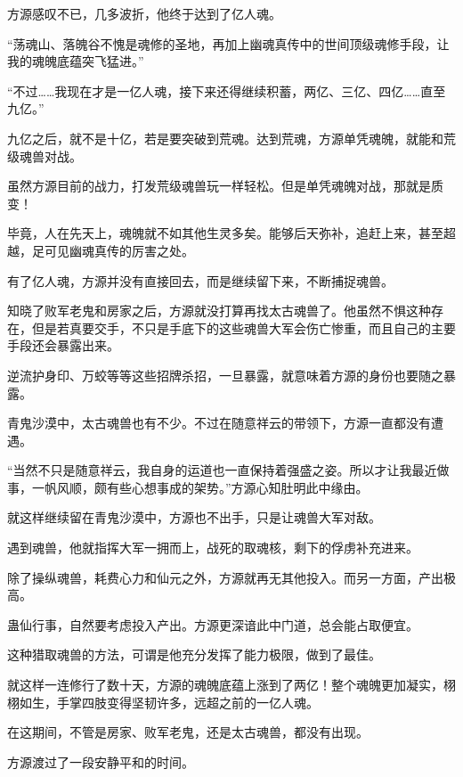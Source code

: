 
\begin{this_body}



方源感叹不已，几多波折，他终于达到了亿人魂。

“荡魂山、落魄谷不愧是魂修的圣地，再加上幽魂真传中的世间顶级魂修手段，让我的魂魄底蕴突飞猛进。”

“不过……我现在才是一亿人魂，接下来还得继续积蓄，两亿、三亿、四亿……直至九亿。”

九亿之后，就不是十亿，若是要突破到荒魂。达到荒魂，方源单凭魂魄，就能和荒级魂兽对战。

虽然方源目前的战力，打发荒级魂兽玩一样轻松。但是单凭魂魄对战，那就是质变！

毕竟，人在先天上，魂魄就不如其他生灵多矣。能够后天弥补，追赶上来，甚至超越，足可见幽魂真传的厉害之处。

有了亿人魂，方源并没有直接回去，而是继续留下来，不断捕捉魂兽。

知晓了败军老鬼和房家之后，方源就没打算再找太古魂兽了。他虽然不惧这种存在，但是若真要交手，不只是手底下的这些魂兽大军会伤亡惨重，而且自己的主要手段还会暴露出来。

逆流护身印、万蛟等等这些招牌杀招，一旦暴露，就意味着方源的身份也要随之暴露。

青鬼沙漠中，太古魂兽也有不少。不过在随意祥云的带领下，方源一直都没有遭遇。

“当然不只是随意祥云，我自身的运道也一直保持着强盛之姿。所以才让我最近做事，一帆风顺，颇有些心想事成的架势。”方源心知肚明此中缘由。

就这样继续留在青鬼沙漠中，方源也不出手，只是让魂兽大军对敌。

遇到魂兽，他就指挥大军一拥而上，战死的取魂核，剩下的俘虏补充进来。

除了操纵魂兽，耗费心力和仙元之外，方源就再无其他投入。而另一方面，产出极高。

蛊仙行事，自然要考虑投入产出。方源更深谙此中门道，总会能占取便宜。

这种猎取魂兽的方法，可谓是他充分发挥了能力极限，做到了最佳。

就这样一连修行了数十天，方源的魂魄底蕴上涨到了两亿！整个魂魄更加凝实，栩栩如生，手掌四肢变得坚韧许多，远超之前的一亿人魂。

在这期间，不管是房家、败军老鬼，还是太古魂兽，都没有出现。

方源渡过了一段安静平和的时间。


\end{this_body}
